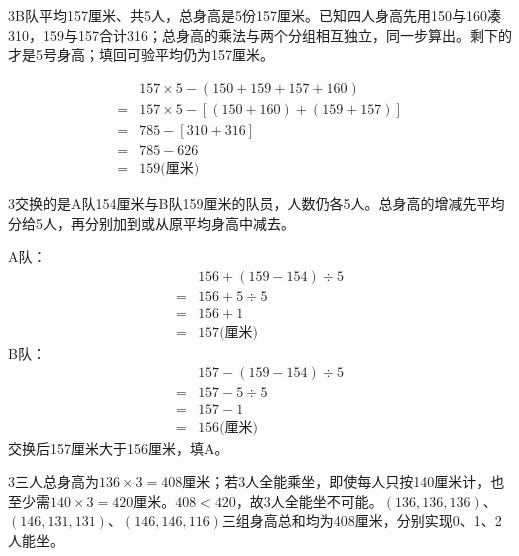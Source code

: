 \documentclass[multi=snippet,border={5bp 20bp 5bp 5bp}]{standalone}
\newenvironment{snippet}[3]{\begin{minipage}{#1bp}\color{answerred}\fontsize{#2}{#3}\selectfont\raggedright}{\end{minipage}}
\begin{document}
\begin{snippet}{505}{11.5}{14}\begin{multicols}{3}\raggedcolumns B队平均157厘米、共5人，总身高是5份157厘米。已知四人身高先用150与160凑310，159与157合计316；总身高的乘法与两个分组相互独立，同一步算出。剩下的才是5号身高；填回可验平均仍为157厘米。\end{multicols}\[\begin{aligned}&157\times5-(150+159+157+160)\\={}&157\times5-[(150+160)+(159+157)]\\={}&785-[310+316]\\={}&785-626\\={}&159\text{(厘米)}\end{aligned}\]\end{snippet}
\begin{snippet}{505}{11.5}{14}\begin{multicols}{3}\raggedcolumns 交换的是A队154厘米与B队159厘米的队员，人数仍各5人。总身高的增减先平均分给5人，再分别加到或从原平均身高中减去。\par A队：\[\begin{aligned}&156+(159-154)\div5\\={}&156+5\div5\\={}&156+1\\={}&157\text{(厘米)}\end{aligned}\]B队：\[\begin{aligned}&157-(159-154)\div5\\={}&157-5\div5\\={}&157-1\\={}&156\text{(厘米)}\end{aligned}\]交换后157厘米大于156厘米，填A。\end{multicols}\end{snippet}
\begin{snippet}{505}{11.5}{14}\begin{multicols}{3}\raggedcolumns 三人总身高为\(136\times3=408\)\allowbreak 厘米；若3人全能乘坐，即使每人只按140厘米计，也至少需\(140\times3=420\)\allowbreak 厘米。\(408<420\)\allowbreak ，故3人全能坐不可能。\((136,\allowbreak 136,\allowbreak 136)\)\allowbreak 、\((146,\allowbreak 131,\allowbreak 131)\)\allowbreak 、\((146,\allowbreak 146,\allowbreak 116)\)\allowbreak 三组身高总和均为408厘米，分别实现0、1、2人能坐。\end{multicols}\end{snippet}
\begin{snippet}{80}{12}{12.8}\SourceSans{}\end{snippet}
\end{document}
